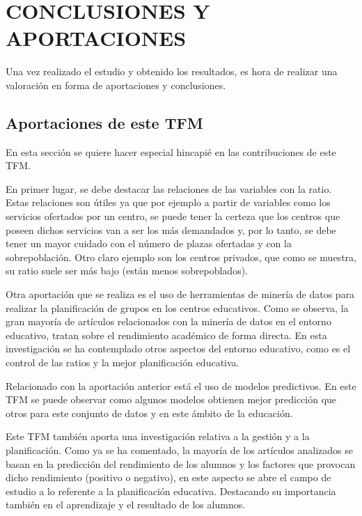 \chapter{CONCLUSIONES Y APORTACIONES} %

Una vez realizado el estudio y obtenido los resultados, es hora de realizar una valoración en forma de aportaciones y conclusiones.

\section{Aportaciones de este TFM}
En esta sección se quiere hacer especial hincapié en las contribuciones de este TFM.

En primer lugar, se debe destacar las relaciones de las variables con la ratio. Estas relaciones son útiles ya que por ejemplo a partir de variables como los servicios ofertados por un centro, se puede tener la certeza que los centros que poseen dichos servicios van a ser los más demandados y, por lo tanto, se debe tener un mayor cuidado con el número de plazas ofertadas y con la sobrepoblación. Otro claro ejemplo son los centros privados, que como se muestra, su ratio suele ser más bajo (están menos sobrepoblados). 

Otra aportación que se realiza es el uso de herramientas de minería de datos para realizar la planificación de grupos en los centros educativos. Como se observa, la gran mayoría de artículos relacionados con la minería de datos en el entorno educativo, tratan sobre el rendimiento académico de forma directa. En esta investigación se ha contemplado otros aspectos del entorno educativo, como es el control de las ratios y la mejor planificación educativa.

Relacionado con la aportación anterior está el uso de modelos predictivos. En este TFM se puede observar como algunos modelos obtienen mejor predicción que otros para este conjunto de datos y en este ámbito de la educación.

Este TFM también aporta una investigación relativa a la gestión y a la planificación. Como ya se ha comentado, la mayoría de los artículos analizados se basan en la predicción del rendimiento de los alumnos y los factores que provocan dicho rendimiento (positivo o negativo), en este aspecto se abre el campo de estudio a lo referente a la planificación educativa. Destacando su importancia también en el aprendizaje y el resultado de los alumnos.


